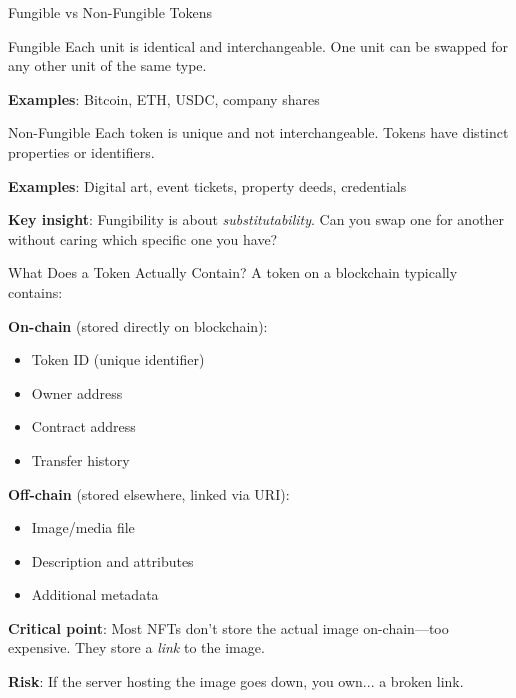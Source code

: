 \documentclass[10pt]{beamer}
\newcommand{\highlight}[1]{\textcolor{AccentOrange}{\textbf{#1}}}
\begin{document}
\begin{frame}{Fungible vs Non-Fungible Tokens}
  
  \begin{block}{Fungible}
    Each unit is identical and interchangeable. One unit can be swapped for any other unit of the same type.
  \end{block}
  
  \textbf{Examples}: Bitcoin, ETH, USDC, company shares
  
  \vspace{1em}
  \begin{block}{Non-Fungible}
    Each token is unique and not interchangeable. Tokens have distinct properties or identifiers.
  \end{block}
  
  \textbf{Examples}: Digital art, event tickets, property deeds, credentials
  
  \vspace{1em}
  \textbf{Key insight}: Fungibility is about \textit{substitutability}. Can you swap one for another without caring which specific one you have?
\end{frame}

\begin{frame}{What Does a Token Actually Contain?}
  A token on a blockchain typically contains:
  
  \vspace{0.5em}
  \textbf{On-chain} (stored directly on blockchain):
  \begin{itemize}
    \item Token ID (unique identifier)
    \item Owner address
    \item Contract address
    \item Transfer history
  \end{itemize}
  
  \vspace{0.5em}
  \textbf{Off-chain} (stored elsewhere, linked via URI):
  \begin{itemize}
    \item Image/media file
    \item Description and attributes
    \item Additional metadata
  \end{itemize}
  
  \vspace{1em}
  \highlight{Critical point}: Most NFTs don't store the actual image on-chain---too expensive. They store a \textit{link} to the image.
  
  \vspace{0.5em}
  \textbf{Risk}: If the server hosting the image goes down, you own... a broken link.
\end{frame}
\end{document}
